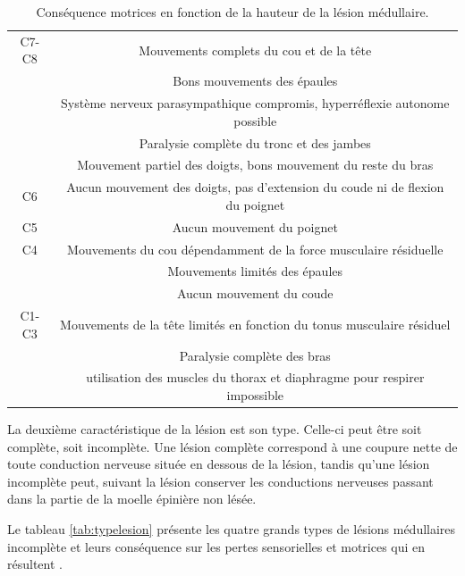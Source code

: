 \documentclass[letterpaper, twoside, 12pt, memoire, creativecommons, hyperref]{thETS}
\begin{document}
\begin{table}[ht]
	\caption{Conséquence motrices en fonction de la hauteur de la lésion médullaire.}
		\begin{tabular}{|c|c|}
		\hline
	    	 	C7-C8 & Mouvements complets du cou et de la tête \\
	    	 	& Bons mouvements des épaules\\
	    	 	& Système nerveux parasympathique compromis, hyperréflexie autonome possible\\
	    	 	& Paralysie complète du tronc et des jambes\\
	    	 	& Mouvement partiel des doigts, bons mouvement du reste du bras\\
	    \hline
	    	 	C6 & Aucun mouvement des doigts, pas d'extension du coude ni de flexion du poignet\\
	    \hline
	    		C5 & Aucun mouvement du poignet\\
	    	\hline
	    		C4 & Mouvements du cou dépendamment de la force musculaire résiduelle \\
	    		& Mouvements limités des épaules\\
	    		& Aucun mouvement du coude\\
		\hline
			C1-C3 & Mouvements de la tête limités en fonction du tonus musculaire résiduel\\
			 & Paralysie complète des bras\\
			 & utilisation des muscles du thorax et diaphragme pour respirer impossible\\	    
	    \hline
		\end{tabular}
	\label{tab:hauteurlesion}
\end{table}

La deuxième caractéristique de la lésion est son type. Celle-ci peut être soit complète, soit incomplète. Une lésion complète correspond à une coupure nette de toute conduction nerveuse située en dessous de la lésion, tandis qu'une lésion incomplète peut, suivant la lésion conserver les conductions nerveuses passant dans la partie de la moelle épinière non lésée.

Le tableau \ref{tab:typelesion} présente les quatre grands types de lésions médullaires incomplète et leurs conséquence sur les pertes sensorielles et motrices qui en résultent \citep{apparelyzed2008}.
\end{document}
